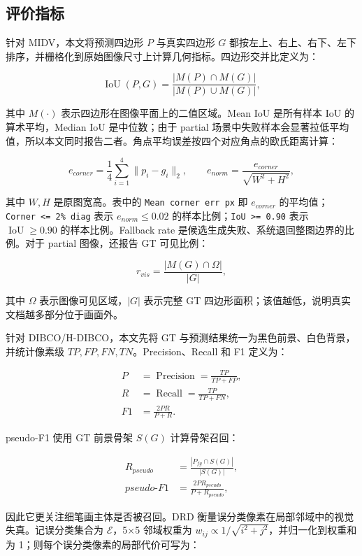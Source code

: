 \documentclass[letterpaper]{article}
\begin{document}
\FloatBarrier

\subsection{评价指标}

针对 MIDV，本文将预测四边形 \(P\) 与真实四边形 \(G\) 都按左上、右上、右下、左下排序，并栅格化到原始图像尺寸上计算几何指标。四边形交并比定义为：

\[
\operatorname{IoU}(P,G)=
\frac{|M(P)\cap M(G)|}{|M(P)\cup M(G)|},
\]

其中 \(M(\cdot)\) 表示四边形在图像平面上的二值区域。Mean IoU 是所有样本 IoU 的算术平均，Median IoU 是中位数；由于 partial 场景中失败样本会显著拉低平均值，所以本文同时报告二者。角点平均误差按四个对应角点的欧氏距离计算：

\[
e_{corner}=\frac{1}{4}\sum_{i=1}^{4}\|p_i-g_i\|_2,
\qquad
e_{norm}=\frac{e_{corner}}{\sqrt{W^2+H^2}},
\]

其中 \(W,H\) 是原图宽高。表中的 \texttt{Mean corner err px} 即 \(e_{corner}\) 的平均值；\texttt{Corner <= 2\% diag} 表示 \(e_{norm}\leq0.02\) 的样本比例；\texttt{IoU >= 0.90} 表示 \(\operatorname{IoU}\geq0.90\) 的样本比例。Fallback rate 是候选生成失败、系统退回整图边界的比例。对于 partial 图像，还报告 GT 可见比例：

\[
r_{vis}=\frac{|M(G)\cap\Omega|}{|G|},
\]

其中 \(\Omega\) 表示图像可见区域，\(|G|\) 表示完整 GT 四边形面积；该值越低，说明真实文档越多部分位于画面外。

针对 DIBCO/H-DIBCO，本文先将 GT 与预测结果统一为黑色前景、白色背景，并统计像素级 \(TP,FP,FN,TN\)。Precision、Recall 和 F1 定义为：

\[
\begin{aligned}
P&=\operatorname{Precision}=\frac{TP}{TP+FP},\\
R&=\operatorname{Recall}=\frac{TP}{TP+FN},\\
F1&=\frac{2PR}{P+R}.
\end{aligned}
\]

pseudo-F1 使用 GT 前景骨架 \(S(G)\) 计算骨架召回：

\[
\begin{aligned}
R_{pseudo}&=\frac{|P_{fg}\cap S(G)|}{|S(G)|},\\
pseudo\text{-}F1&=\frac{2P R_{pseudo}}{P+R_{pseudo}},
\end{aligned}
\]

因此它更关注细笔画主体是否被召回。DRD 衡量误分类像素在局部邻域中的视觉失真。记误分类集合为 \(\mathcal{E}\)，5\(\times\)5 邻域权重为 \(w_{ij}\propto1/\sqrt{i^2+j^2}\)，并归一化到权重和为 1；则每个误分类像素的局部代价可写为：
\end{document}
